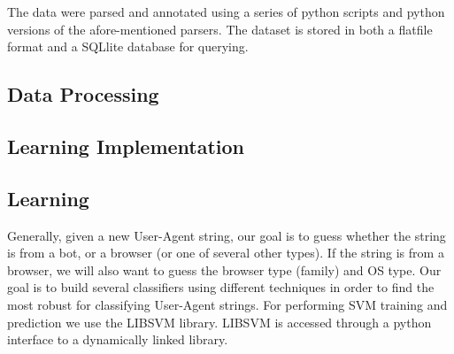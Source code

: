 \documentclass[10pt]{article}
\begin{document}
The data were parsed and annotated using a series of python scripts and python versions of the afore-mentioned parsers.  The dataset is stored in both a flatfile format and a SQLlite database for querying.  
\subsection{Data Processing}

\subsection{Learning Implementation}
\subsection{Learning}
Generally, given a new User-Agent string, our goal is to guess whether the string is from a bot, or a browser (or one of several other types).  If the string is from a browser, we will also want to guess the browser type (family) and OS type.    Our goal is to build several classifiers using different techniques in order to find the most robust for classifying User-Agent strings.  For performing SVM training and prediction we use the LIBSVM library.\cite{libsvm}  LIBSVM is accessed through a python interface to a dynamically linked library. 
\end{document}
